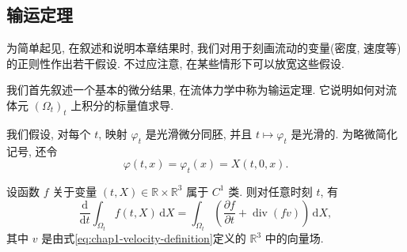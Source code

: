 \subsection{输运定理}
\label{sec:chap1-transport-theorem}

为简单起见, 在叙述和说明本章结果时, 我们对用于刻画流动的变量(密度, 速度等)的正则性作出若干假设. 不过应注意, 在某些情形下可以放宽这些假设.

我们首先叙述一个基本的微分结果, 在流体力学中称为输运定理. 它说明如何对流体元 $(\Omega_t)_t$ 上积分的标量值求导.

我们假设, 对每个 $t$, 映射 $\varphi_t$ 是光滑微分同胚, 并且 $t\mapsto\varphi_t$ 是光滑的. 为略微简化记号, 还令
\[
  \varphi(t,x)=\varphi_t(x)=X(t,0,x).
\]

\begin{Theorem}
\label{thm:chap1-transport}
设函数 $f$ 关于变量 $(t,X)\in\mathbb{R}\times\mathbb{R}^3$ 属于 $C^1$ 类. 则对任意时刻 $t$, 有
\[
  \frac{\mathrm{d}}{\mathrm{d}t}\int_{\Omega_t} f(t,X)\,\mathrm{d}X
  =\int_{\Omega_t}\left(\frac{\partial f}{\partial t}+\operatorname{div}(fv)\right)\,\mathrm{d}X,
\]
其中 $v$ 是由式\eqref{eq:chap1-velocity-definition}定义的 $\mathbb{R}^3$ 中的向量场.
\end{Theorem}

